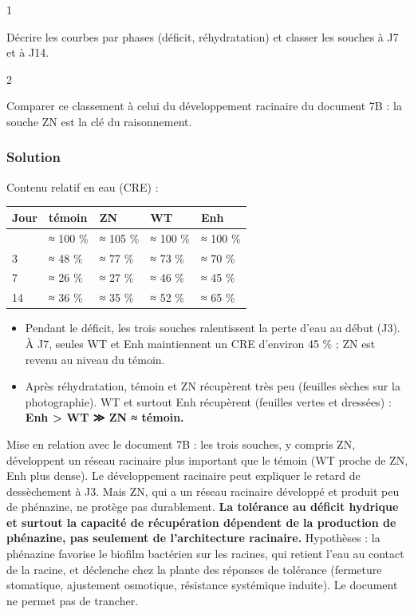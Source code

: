 \documentclass[11pt,a4paper]{article}
\providecommand{\tightlist}{\setlength{\itemsep}{0pt}\setlength{\parskip}{0pt}}
\begin{document}
\begin{indication}{1}

Décrire les courbes par phases (déficit, réhydratation) et classer les souches à J7 et à J14.

\end{indication}

\begin{indication}{2}

Comparer ce classement à celui du développement racinaire du document 7B : la souche ZN est la clé du raisonnement.

\end{indication}

\hypertarget{solution-18}{%
\subsubsection{Solution}\label{solution-18}}

Contenu relatif en eau (CRE) :

\begin{longtable}[]{@{}lllll@{}}
\toprule\noalign{}
Jour & témoin & ZN & WT & Enh \\
\midrule\noalign{}
\endhead
\bottomrule\noalign{}
\endlastfoot
0 & ≈ 100 \% & ≈ 105 \% & ≈ 100 \% & ≈ 100 \% \\
3 & ≈ 48 \% & ≈ 77 \% & ≈ 73 \% & ≈ 70 \% \\
7 & ≈ 26 \% & ≈ 27 \% & ≈ 46 \% & ≈ 45 \% \\
14 & ≈ 36 \% & ≈ 35 \% & ≈ 52 \% & ≈ 65 \% \\
\end{longtable}

\begin{itemize}
\tightlist
\item
  Pendant le déficit, les trois souches ralentissent la perte d'eau au début (J3). À J7, seules WT et Enh maintiennent un CRE d'environ 45 \% ; ZN est revenu au niveau du témoin.
\item
  Après réhydratation, témoin et ZN récupèrent très peu (feuilles sèches sur la photographie). WT et surtout Enh récupèrent (feuilles vertes et dressées) : \textbf{Enh \textgreater{} WT ≫ ZN ≈ témoin.}
\end{itemize}

Mise en relation avec le document 7B : les trois souches, y compris ZN, développent un réseau racinaire plus important que le témoin (WT proche de ZN, Enh plus dense). Le développement racinaire peut expliquer le retard de dessèchement à J3. Mais ZN, qui a un réseau racinaire développé et produit peu de phénazine, ne protège pas durablement. \textbf{La tolérance au déficit hydrique et surtout la capacité de récupération dépendent de la production de phénazine, pas seulement de l'architecture racinaire.} Hypothèses : la phénazine favorise le biofilm bactérien sur les racines, qui retient l'eau au contact de la racine, et déclenche chez la plante des réponses de tolérance (fermeture stomatique, ajustement osmotique, résistance systémique induite). Le document ne permet pas de trancher.
\end{document}
